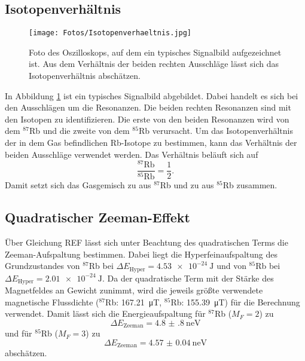 \subsection{Isotopenverhältnis}

\begin{figure}
    \centering
    \texttt{[image: Fotos/Isotopenverhaeltnis.jpg]}
    \caption{Foto des Oszilloskops, auf dem ein typisches Signalbild aufgezeichnet ist. Aus dem Verhältnis der beiden rechten Ausschläge lässt sich das Isotopenverhältnis abschätzen.}
    \label{fig:Iso}
\end{figure}

In Abbildung \ref{fig:Iso} ist ein typisches Signalbild abgebildet.
Dabei handelt es sich bei den Ausschlägen um die Resonanzen.
Die beiden rechten Resonanzen sind mit den Isotopen zu identifizieren. 
Die erste von den beiden Resonanzen wird von dem  $^{87}$Rb und die zweite von dem $^{85}$Rb verursacht.
Um das Isotopenverhältnis der in dem Gas befindlichen Rb-Isotope zu bestimmen, kann das Verhältnis der beiden Ausschläge verwendet werden.
Das Verhältnis beläuft sich auf 
\begin{equation*}
    \frac{^{87}\text{Rb}}{^{85}\text{Rb}} = \frac{1}{2}.
\end{equation*}
Damit setzt sich das Gasgemisch zu  aus $^{87}$Rb und zu  aus $^{85}$Rb zusammen.


\subsection{Quadratischer Zeeman-Effekt}
Über Gleichung REF lässt sich unter Beachtung des quadratischen Terms die Zeeman-Aufspaltung bestimmen. 
Dabei liegt die Hyperfeinaufspaltung des Grundzustandes von $^{87}$Rb bei $\Delta E_{\text{Hyper}}=\SI{4.53e-24}{\joule}$ und von $^{85}$Rb bei $\Delta E_{\text{Hyper}}=\SI{2.01e-24}{\joule}$.
Da der quadratische Term mit der Stärke des Magnetfeldes an Gewicht zunimmt, wird die jeweils größte verwendete magnetische Flussdichte ($^{87}$Rb: \SI{167.21}{\micro\tesla}, $^{85}$Rb: \SI{155.39}{\micro\tesla}) für die Berechnung verwendet.
Damit lässt sich die Energieaufspaltung für $^{87}$Rb ($M_F = 2$) zu 
\begin{equation*}
    \Delta E_{\text{Zeeman}} = \SI{4.8(8)}{\nano\eV}
\end{equation*}
und für $^{85}$Rb ($M_F = 3$) zu 
\begin{equation}
    \Delta E_{\text{Zeeman}} = \SI{4.57(4)}{\nano\eV}
\end{equation}
abschätzen.



